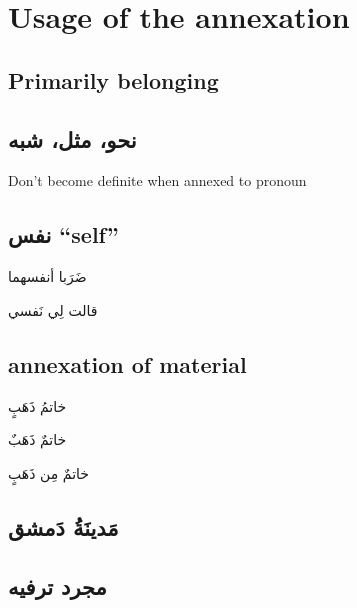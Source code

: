\documentclass[
  10pt,
]{book}
\begin{document}
\section{Usage of the annexation}\label{usage-of-the-annexation}

\subsection{Primarily belonging}\label{primarily-belonging}

\subsection{\texorpdfstring{\foreignlanguage{arabic}{نحو، مثل، شبه}}{نحو، مثل، شبه}}\label{ux646ux62dux648-ux645ux62bux644-ux634ux628ux647}

Don't become definite when annexed to pronoun

\subsection{\texorpdfstring{\foreignlanguage{arabic}{نفس} \enquote{self}}{نفس ``self''}}\label{ux646ux641ux633-self}

\foreignlanguage{arabic}{ضَرَبا أنفسهما}

\foreignlanguage{arabic}{قالت لِي نَفسي}

\subsection{annexation of material}\label{annexation-of-material}

\foreignlanguage{arabic}{خاتمُ ذَهَبٍ}

\foreignlanguage{arabic}{خاتمٌ ذَهَبٌ}

\foreignlanguage{arabic}{خاتمٌ مِن ذَهَبٍ}

\subsection{\texorpdfstring{\foreignlanguage{arabic}{مَدينَةُ دَمشق}}{مَدينَةُ دَمشق}}\label{ux645ux62fux64aux646ux629-ux62fux645ux634ux642}

\subsection{\texorpdfstring{\foreignlanguage{arabic}{مجرد ترفيه}}{مجرد ترفيه}}\label{ux645ux62cux631ux62f-ux62aux631ux641ux64aux647}
\end{document}
